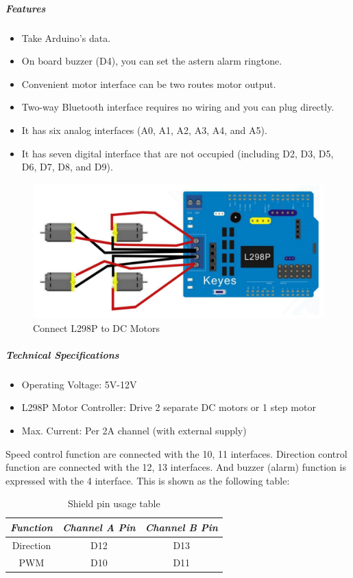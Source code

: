\documentclass[11pt]{article}
\begin{document}
\subparagraph*{Features}
\begin{itemize}
\item Take Arduino's data.
\item On board buzzer (D4), you can set the astern alarm ringtone.
\item Convenient motor interface can be two routes motor output.
\item Two-way Bluetooth interface requires no wiring and you can plug directly.
\item It has six analog interfaces (A0, A1, A2, A3, A4, and A5).
\item It has seven digital interface that are not occupied (including D2, D3, D5, D6, D7, D8, and D9).
\end{itemize}
\begin{figure}[h]
\centering
\includegraphics[scale=0.30]{connectl298.png}
\caption{Connect L298P to DC Motors}
\end{figure}

\vspace{0.1cm}

\subparagraph*{Technical Specifications}
\begin{itemize}
\item Operating Voltage: 5V-12V
\item L298P Motor Controller: Drive 2 separate DC motors or 1 step motor
\item Max. Current: Per 2A channel (with external supply)\\
\end{itemize}
\begin{flushleft}
Speed control function are connected with the 10, 11 interfaces. Direction control function are connected with the 12, 13 interfaces. And buzzer (alarm) function is expressed with the 4 interface. This is shown as the following table:
\end{flushleft}
\begin{table}[h]
\centering 
\begin{tabular}{|c|c|c|}
 \hline
 \textbf{\emph{\cellcolor{red!27}Function}} & \textbf{\emph{\cellcolor{red!27}Channel A Pin}} & \textbf{\emph{\cellcolor{red!27}Channel B Pin}}	\\ [0.5ex] \hline
 Direction & D12 & D13 \\  \hline
 PWM & D10 & D11\\ 
 \hline
\end{tabular}
\caption{Shield pin usage table}
\label{table:1}
\end{table}
\end{document}
